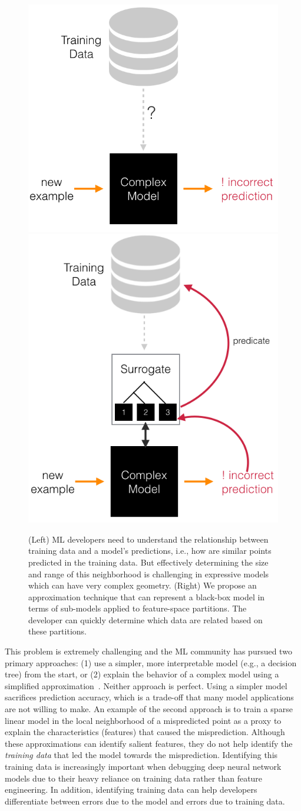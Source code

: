 \begin{figure}
    \centering
    \includegraphics[width=0.35\columnwidth]{figures/teaser1.png}
    \hspace{2em}
    \includegraphics[width=0.35\columnwidth]{figures/teaser2.png}
    \caption{(Left) ML developers need to understand the relationship between training data and a model's predictions, i.e., how are similar points predicted in the training data. But effectively determining the size and range of this neighborhood is challenging in expressive models which can have very complex geometry. (Right) We propose an approximation technique that can represent a black-box model in terms of sub-models applied to feature-space partitions. The developer can quickly determine which data are related based on these partitions.}
    \label{fig:my_label}
\end{figure}

This problem is extremely challenging and the ML community has pursued two primary approaches: (1) use a simpler, more interpretable model (e.g., a decision tree) from the start, or (2) explain the behavior of a complex model using a simplified approximation~\cite{taylor2016alignment, lei2016rationalizing, ribeiro2016should}. Neither approach is perfect. 
Using a simpler model sacrifices prediction accuracy, which is a trade-off that many model applications are not willing to make.
An example of the second approach is to train a sparse linear model in the local neighborhood of a mispredicted point as a proxy to explain the characteristics (features) that caused the misprediction\cite{taylor2016alignment, lei2016rationalizing, ribeiro2016should}.
Although these approximations can identify salient features, they do not help identify the {\it training data} that led the model towards the misprediction.
Identifying this training data is increasingly important when debugging deep neural network models due to their heavy reliance on training data rather than feature engineering.
In addition, identifying training data can help developers differentiate between errors due to the model and errors due to training data.



